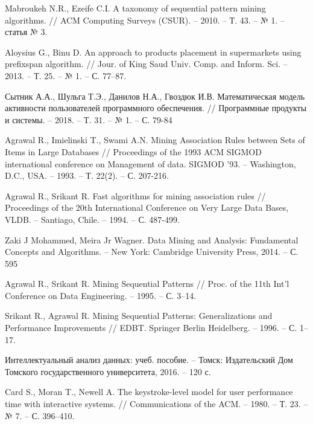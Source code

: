 \begin{thebibliography}{1}
	Mabroukeh N.R., Ezeife C.I.
	A taxonomy of sequential pattern mining algorithms.
	// ACM Computing Surveys (CSUR). -- 2010. -- Т. 43. -- № 1. -- статья № 3.
	
	Aloysius G., Binu D.
	An approach to products placement in supermarkets using prefixspan algorithm.
	// Jour. of King Saud Univ. Comp. and Inform. Sci. -- 2013. -- Т. 25. -- № 1. -- С. 77–87.
	
	Сытник А.А., Шульга Т.Э., Данилов Н.А., Гвоздюк И.В.
	Математическая модель активности пользователей программного обеспечения.
	// Программные продукты и системы. -- 2018. -- Т. 31. -- № 1. -- С. 79-84 
	
	Agrawal R., Imielinski T., Swami A.N.
	Mining Association Rules between Sets of Items in Large Databases
	// Proceedings of the 1993 ACM SIGMOD international conference on Management of data. SIGMOD '93. -- Washington, D.C., USA. -- 1993. -- Т. 22(2). -- С. 207-216.
	
	Agrawal R., Srikant R.
	Fast algorithms for mining association rules
	// Proceedings of the 20th International Conference on Very Large Data Bases, VLDB. -- Santiago, Chile. -- 1994. -- С. 487-499.
	
	Zaki J Mohammed, Meira Jr Wagner. Data Mining and Analysis: Fundamental Concepts and Algorithms. -- New York: Cambridge University Press, 2014. -- С. 595
	
	Agrawal R., Srikant R. Mining Sequential Patterns // Proc. of the 11th Int’l
	Conference on Data Engineering. -- 1995. -- С. 3–14.
	
	Srikant R., Agrawal R. Mining Sequential Patterns: Generalizations and
	Performance Improvements // EDBT. Springer Berlin Heidelberg. -- 1996.
	-- С. 1–17.
	
	Интеллектуальный анализ данных: учеб. пособие. --
	Томск: Издательский Дом Томского государственного
	университета, 2016. -- 120 с.
	
	Card S., Moran T., Newell A.
	The keystroke-level model for user performance time with interactive systems.
	// Communications of the ACM. -- 1980. -- Т. 23. -- № 7. -- С. 396–410.
	
	
\end{thebibliography}
